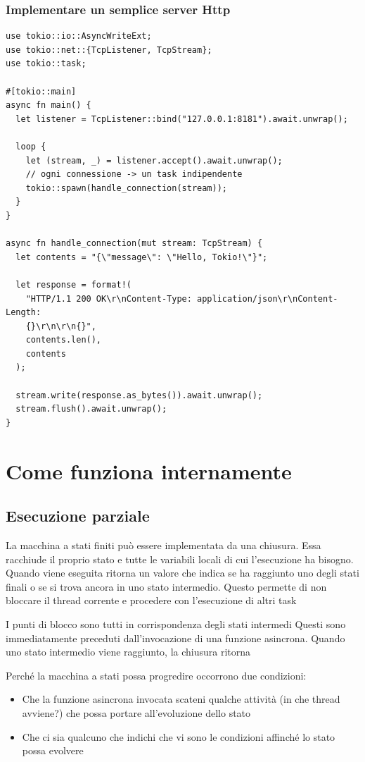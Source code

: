 \subsubsection{Implementare un semplice server Http}

\begin{verbatim}
use tokio::io::AsyncWriteExt;
use tokio::net::{TcpListener, TcpStream};
use tokio::task;

#[tokio::main]
async fn main() {
  let listener = TcpListener::bind("127.0.0.1:8181").await.unwrap();

  loop {
    let (stream, _) = listener.accept().await.unwrap();
    // ogni connessione -> un task indipendente
    tokio::spawn(handle_connection(stream));
  }
}

async fn handle_connection(mut stream: TcpStream) {
  let contents = "{\"message\": \"Hello, Tokio!\"}";

  let response = format!(
    "HTTP/1.1 200 OK\r\nContent-Type: application/json\r\nContent-Length:
    {}\r\n\r\n{}",
    contents.len(),
    contents
  );

  stream.write(response.as_bytes()).await.unwrap();
  stream.flush().await.unwrap();
}
\end{verbatim}

\section{Come funziona internamente}

\subsection{Esecuzione parziale}

La macchina a stati finiti può essere implementata da una chiusura.
Essa racchiude il proprio stato e tutte le variabili locali di cui l'esecuzione ha bisogno.
Quando viene eseguita ritorna un valore che indica se ha raggiunto uno degli stati finali o se si trova
ancora in uno stato intermedio.
Questo permette di non bloccare il thread corrente e procedere con l'esecuzione di altri task


I punti di blocco sono tutti in corrispondenza degli stati intermedi
Questi sono immediatamente preceduti dall'invocazione di una funzione asincrona.
Quando uno stato intermedio viene raggiunto, la chiusura ritorna


Perché la macchina a stati possa progredire occorrono due condizioni:
\begin{itemize}
  \item Che la funzione asincrona invocata scateni qualche attività (in che thread avviene?) che possa portare all'evoluzione dello stato
  \item Che ci sia qualcuno che indichi che vi sono le condizioni affinché lo stato possa evolvere
\end{itemize}




